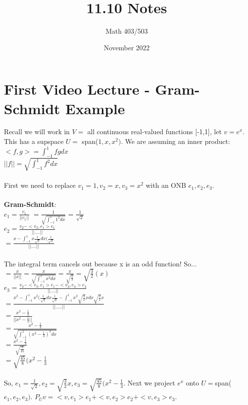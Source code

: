 \documentclass{article}
\title{11.10 Notes}
\author{Math 403/503}
\date{November 2022}
\begin{document}
\maketitle

\section{First Video Lecture - Gram-Schmidt Example}
Recall we will work in $V =$ all continuous real-valued functions [-1,1], let $v=e^x$. This has a supspace $U= $ span($1, x, x^2)$. We are assuming an inner product: \\ 
$<f,g> = \int_{-1}^{1} fg dx$\\
$||f|| = \sqrt{\int_{-1}^{1} f^2 dx}$\\\\
First we need to replace $v_1 = 1, v_2 = x, v_3 = x^2$ with an ONB $e_1, e_2, e_3$. \\\\
\textbf{Gram-Schmidt}:\\
$e_1 = \frac{v_1}{||v_1||}$ $= \frac{1}{\sqrt{\int_{-1}^{1} 1^2 dx}}$ = $\frac{1}{\sqrt{2}}$\\
$e_2 = \frac{v_2 - <v_2,e_1>e_1}{||....||}$\\
$= \frac{x - \int_{-1}^{1} x \frac{1}{\sqrt{2}}dx (\frac{1}{\sqrt{2}}}{||....||}$\\\\
The integral term cancels out because x is an odd function! So... \\
$= \frac{x}{||x||} = \frac{x}{\sqrt{\int_{-1}^{1} x^2 dx}} = \frac{x}{\sqrt{\frac{2}{3}}} = \sqrt{\frac{3}{2}} (x)$\\
$e_3 = \frac{v_3 - <v_3,e_1>e_1 - <v_3, e_2>e_2}{||....||}$\\
$= \frac{x^2 - \int_{-1}^{1} x^2(\frac{1}{\sqrt{2}} dx \frac{1}{\sqrt{2}} - \int_{-1}^{1} x^2 \sqrt{\frac{3}{2}} x dx \sqrt{\frac{3}{2}} x}{||.....||}$ \\
$ = \frac{x^2 - \frac{1}{3}}{||x^2 - \frac{1}{3}||}$\\
$= \frac{x^2 - \frac{1}{3}}{\sqrt{\int_{-1}^{1} (x^2 - \frac{1}{3})^2 dx}}$ \\
$= \frac{x^2 - \frac{1}{3}}{\sqrt{\frac{8}{45}}}$\\
$= \sqrt{\frac{45}{8}}(x^2 - \frac{1}{3}$\\\\
So, $e_1 = \frac{1}{\sqrt{2}}, e_2 = \sqrt{\frac{3}{2}} x, e_3 = \sqrt{\frac{45}{8}} (x^2 - \frac{1}{3}$. Next we project $e^x$ onto $U = $span($e_1, e_2, e_3)$. $P_Uv = <v, e_1>e_1 + <v, e_2>e_2 + <v,e_3>e_3.$ \\
\end{document}
